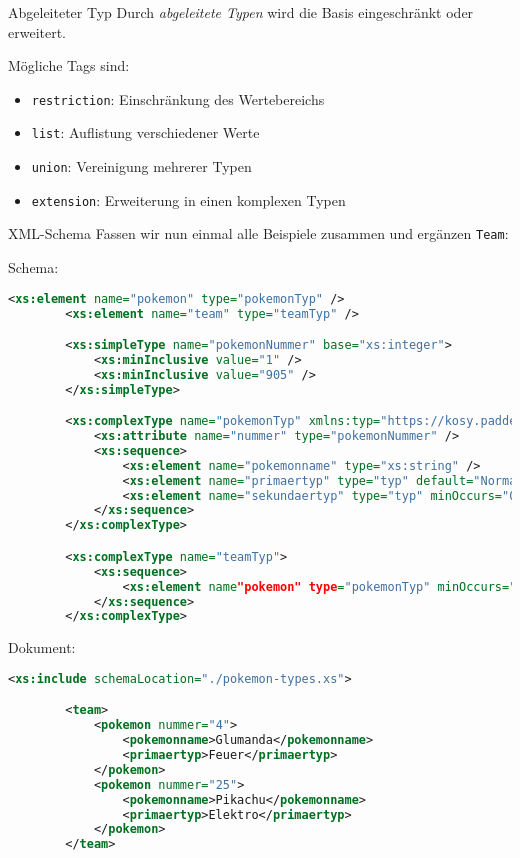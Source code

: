 \begin{bonus}{Abgeleiteter Typ}
    Durch \emph{abgeleitete Typen} wird die Basis eingeschränkt oder erweitert.
    
    Mögliche Tags sind:
    
    \begin{itemize}
        \item \texttt{restriction}: Einschränkung des Wertebereichs
        \item \texttt{list}: Auflistung verschiedener Werte
        \item \texttt{union}: Vereinigung mehrerer Typen
        \item \texttt{extension}: Erweiterung in einen komplexen Typen
    \end{itemize}
\end{bonus}

\begin{example}{XML-Schema}
    Fassen wir nun einmal alle Beispiele zusammen und ergänzen \texttt{Team}:
    
    Schema:
    \begin{lstlisting}[language=XML]
        <xs:element name="pokemon" type="pokemonTyp" />
        <xs:element name="team" type="teamTyp" />

        <xs:simpleType name="pokemonNummer" base="xs:integer">
            <xs:minInclusive value="1" />
            <xs:minInclusive value="905" />
        </xs:simpleType>

        <xs:complexType name="pokemonTyp" xmlns:typ="https://kosy.paddel.xyz/typ">
            <xs:attribute name="nummer" type="pokemonNummer" />
            <xs:sequence>
                <xs:element name="pokemonname" type="xs:string" />
                <xs:element name="primaertyp" type="typ" default="Normal" />
                <xs:element name="sekundaertyp" type="typ" minOccurs="0" />
            </xs:sequence>
        </xs:complexType>

        <xs:complexType name="teamTyp">
            <xs:sequence>
                <xs:element name"pokemon" type="pokemonTyp" minOccurs="0" maxOccurs="6" />
            </xs:sequence>
        </xs:complexType>
    \end{lstlisting}
    
    Dokument:
    \begin{lstlisting}[language=XML]
        <xs:include schemaLocation="./pokemon-types.xs">

        <team>
            <pokemon nummer="4">
                <pokemonname>Glumanda</pokemonname>
                <primaertyp>Feuer</primaertyp>
            </pokemon>
            <pokemon nummer="25">
                <pokemonname>Pikachu</pokemonname>
                <primaertyp>Elektro</primaertyp>
            </pokemon>
        </team>
    \end{lstlisting}
\end{example}

